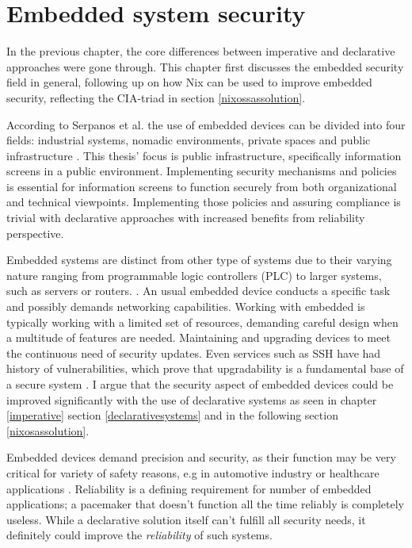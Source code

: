 \chapter{Embedded system security} \label{embedded}

In the previous chapter, the core differences between imperative and
declarative approaches were gone through. This chapter first discusses
the embedded security field in general, following up on how Nix can be
used to improve embedded security, reflecting the CIA-triad in section
\ref{nixossassolution}.

According to Serpanos et al. the use of embedded devices can be
divided into four fields: industrial systems, nomadic environments,
private spaces and public infrastructure
\cite{serpanos2013security}. This thesis' focus is public
infrastructure, specifically information screens in a public
environment. Implementing security mechanisms and policies is
essential for information screens to function securely from both
organizational and technical viewpoints. Implementing those policies
and assuring compliance is trivial with declarative approaches with
increased benefits from reliability perspective.

Embedded systems are distinct from other type of systems due to their
varying nature ranging from programmable logic controllers (PLC) to
larger systems, such as servers or
routers. \cite{fysarakis2014embedded}. An usual embedded device
conducts a specific task and possibly demands networking
capabilities. Working with embedded is typically working with a
limited set of resources, demanding careful design when a multitude of
features are needed. Maintaining and upgrading devices to meet the
continuous need of security updates. Even services such as SSH have
had history of vulnerabilities, which prove that upgradability is a
fundamental base of a secure system
\cite{secopsolutionHistorySecOps}. I argue that the security aspect of
embedded devices could be improved significantly with the use of
declarative systems as seen in chapter \ref{imperative} section
\ref{declarativesystems} and in the following section
\ref{nixosassolution}.

Embedded devices demand precision and security, as their function may
be very critical for variety of safety reasons, e.g in automotive
industry or healthcare applications \cite{turab2019secure,
  fysarakis2014embedded}. Reliability is a defining requirement for
number of embedded applications; a pacemaker that doesn't function all
the time reliably is completely useless. While a declarative solution
itself can't fulfill all security needs, it definitely could improve
the \textit{reliability} of such systems.

